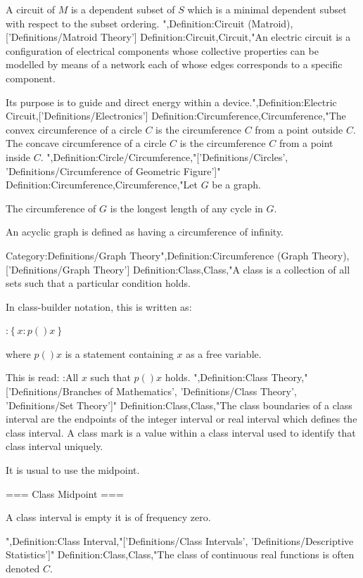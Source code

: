 A circuit of $M$ is a dependent subset of $S$ which is a minimal dependent subset with respect to the subset ordering.
",Definition:Circuit (Matroid),['Definitions/Matroid Theory']
Definition:Circuit,Circuit,"An electric circuit is a configuration of electrical components whose collective properties can be modelled by means of a network each of whose edges corresponds to a specific component.

Its purpose is to guide and direct energy within a device.",Definition:Electric Circuit,['Definitions/Electronics']
Definition:Circumference,Circumference,"The convex circumference of a circle $C$ is the circumference $C$ from a point outside $C$.
The concave circumference of a circle $C$ is the circumference $C$ from a point inside $C$.
",Definition:Circle/Circumference,"['Definitions/Circles', 'Definitions/Circumference of Geometric Figure']"
Definition:Circumference,Circumference,"Let $G$ be a graph.

The circumference of $G$ is the longest length of any cycle in $G$.


An acyclic graph is defined as having a circumference of infinity.

Category:Definitions/Graph Theory",Definition:Circumference (Graph Theory),['Definitions/Graph Theory']
Definition:Class,Class,"A class is a collection of all sets such that a particular condition holds.


In class-builder notation, this is written as:

:$\left\lbrace x: p \left(   \right)x \right\rbrace$

where $p \left(   \right)x$ is a statement containing $x$ as a free variable.  

This is read:
:All $x$ such that $p \left(   \right)x$ holds.
",Definition:Class Theory,"['Definitions/Branches of Mathematics', 'Definitions/Class Theory', 'Definitions/Set Theory']"
Definition:Class,Class,"The class boundaries of a class interval are the endpoints of the integer interval or real interval which defines the class interval.
A class mark is a value within a class interval used to identify that class interval uniquely.

It is usual to use the midpoint.


=== Class Midpoint ===

A class interval is empty  it is of frequency zero.

",Definition:Class Interval,"['Definitions/Class Intervals', 'Definitions/Descriptive Statistics']"
Definition:Class,Class,"The class of continuous real functions is often denoted $C$.

